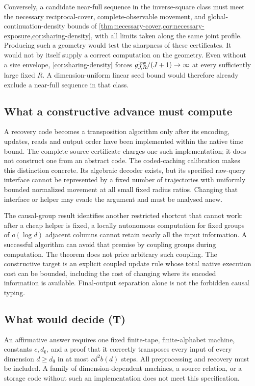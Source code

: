 Conversely, a candidate near-full sequence in the inverse-square class
must meet the necessary reciprocal-cover, complete-observable movement,
and global-continuation-density bounds of
\cref{thm:necessary-cover,cor:necessary-exposure,cor:sharing-density},
with all limits taken along the same joint profile. Producing such a
geometry would test the sharpness of these certificates. It would not
by itself supply a correct computation on the geometry.
Even without a size envelope, \cref{cor:sharing-density} forces
$g^{\rm low}_{J,R}/(J+1)\to\infty$ at every sufficiently large fixed
$R$. A dimension-uniform linear seed bound would therefore already
exclude a near-full sequence in that class.

\subsection{What a constructive advance must compute}

A recovery code becomes a transposition algorithm only after its
encoding, updates, reads and output order have been implemented within
the native time bound. The complete-source certificate charges one
such implementation; it does not construct one from an abstract code.
The coded-caching calibration makes this distinction concrete. Its
algebraic decoder exists, but its specified raw-query interface cannot
be represented by a fixed number of trajectories with uniformly bounded
normalized movement at all small fixed radius ratios. Changing that
interface or helper may evade the argument and must be analysed anew.

The causal-group result identifies another restricted shortcut that
cannot work: after a cheap helper is fixed, a locally autonomous
computation for fixed groups of $o(\log d)$ adjacent columns cannot
retain nearly all the input information. A successful algorithm can
avoid that premise by coupling groups during computation. The theorem
does not price arbitrary such coupling. The constructive target is an
explicit coupled update rule whose total native execution cost can be
bounded, including the cost of changing where its encoded information
is available. Final-output separation alone is not the forbidden
causal typing.

\subsection{What would decide (T)}

An affirmative answer requires one fixed finite-tape, finite-alphabet
machine, constants $c,d_0$, and a proof that it correctly transposes
every input of every dimension $d\ge d_0$ in at most $cd^2b(d)$ steps.
All preprocessing and recovery must be included. A family of
dimension-dependent machines, a source relation, or a storage code
without such an implementation does not meet this specification.

